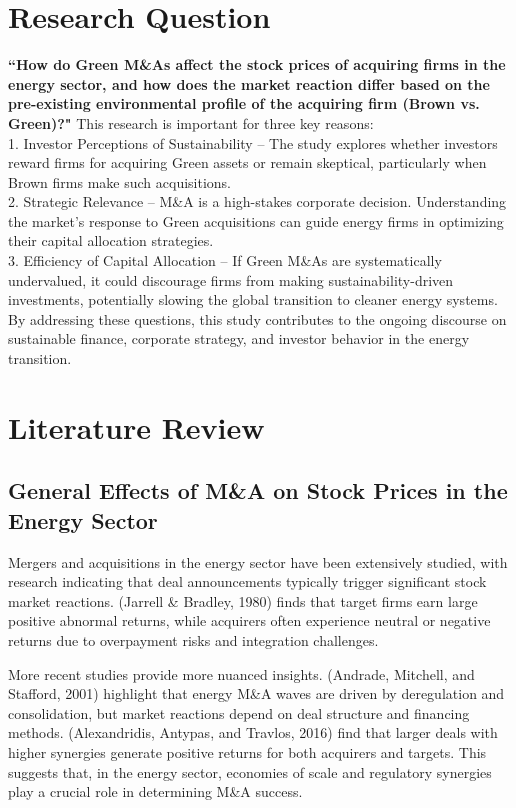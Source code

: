 \documentclass[a4paper]{article}
\begin{document}
 
\section{Research Question}

\textbf{``How do Green M\&As affect the stock prices of acquiring firms in the energy sector, and how does the market reaction differ based on the pre-existing environmental profile of the acquiring firm (Brown vs. Green)?"}
\bigbreak \noindent
This research is important for three key reasons:
\\
1. Investor Perceptions of Sustainability – The study explores whether investors reward firms for acquiring Green assets or remain skeptical, particularly when Brown firms make such acquisitions.
\\
2. Strategic Relevance – M\&A is a high-stakes corporate decision. Understanding the market's response to Green acquisitions can guide energy firms in optimizing their capital allocation strategies.
\\
3. Efficiency of Capital Allocation – If Green M\&As are systematically undervalued, it could discourage firms from making sustainability-driven investments, potentially slowing the global transition to cleaner energy systems.
\bigbreak \noindent
By addressing these questions, this study contributes to the ongoing discourse on sustainable finance, corporate strategy, and investor behavior in the energy transition.

\section{Literature Review}

\subsection{General Effects of M\&A on Stock Prices in the Energy Sector}
Mergers and acquisitions in the energy sector have been extensively studied, with research indicating that deal announcements typically trigger significant stock market reactions. (Jarrell \& Bradley, 1980) \autocite{jarrell1980} finds that target firms earn large positive abnormal returns, while acquirers often experience neutral or negative returns due to overpayment risks and integration challenges.

More recent studies provide more nuanced insights. (Andrade, Mitchell, and Stafford, 2001) \autocite{andrade2001} highlight that energy M\&A waves are driven by deregulation and consolidation, but market reactions depend on deal structure and financing methods. (Alexandridis, Antypas, and Travlos, 2016) \autocite{alexandridis2016} find that larger deals with higher synergies generate positive returns for both acquirers and targets. This suggests that, in the energy sector, economies of scale and regulatory synergies play a crucial role in determining M\&A success.
\end{document}
